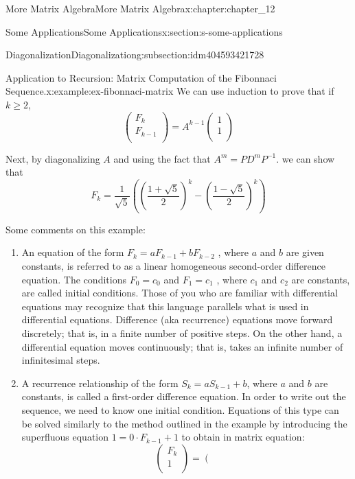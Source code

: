 \documentclass[twoside,10pt,]{book}
\numberwithin{equation}{section}
\begin{document}
\begin{chapterptx}{More Matrix Algebra}{}{More Matrix Algebra}{}{}{x:chapter:chapter_12}
\begin{sectionptx}{Some Applications}{}{Some Applications}{}{}{x:section:s-some-applications}
\begin{subsectionptx}{Diagonalization}{}{Diagonalization}{}{}{g:subsection:idm404593421728}
\begin{example}{Application to Recursion: Matrix Computation of the Fibonnaci Sequence.}{x:example:ex-fibonnaci-matrix}
We can use induction to prove that if \(k\geq 2\),%
\begin{equation*}
\left(
\begin{array}{c}
F_k \\
F_{k-1} \\
\end{array}
\right)=A^{k-1} \left(
\begin{array}{c}
1 \\
1 \\
\end{array}
\right)
\end{equation*}
%
\par
Next, by diagonalizing \(A\) and using the fact that \(A^{m }= P D^m P^{-1}\). we can show that%
\begin{equation*}
F_k= \frac{1}{\sqrt{5}}\left( \left(\frac{1+\sqrt{5}}{2}\right)^k- \left(\frac{1-\sqrt{5}}{2}\right)^k\right)
\end{equation*}
%
\par
Some comments on this example:%
\begin{enumerate}[label=(\arabic*)]
\item{}An equation of the form \(F_k = a F_{k-1} + b F_{k-2}\) , where \(a\) and \(b\) are given constants, is  referred to as a linear homogeneous second-order difference equation. The conditions \(F_0=c_0\) and \(F_1= c_1\) , where \(c_1\) and \(c_2\) are constants, are called initial conditions. Those of you who are familiar with differential equations may recognize that this language parallels what is used in differential equations. Difference (aka recurrence) equations move forward discretely; that is, in a finite number of positive steps.  On the other hand,  a differential equation moves continuously; that is, takes an infinite number of infinitesimal steps.%
\item{}A recurrence relationship of the form \(S_k = a S_{k-1} + b\), where \(a\) and \(b\) are constants, is called a first-order difference equation. In order to write out the sequence, we need to know one initial condition.  Equations of this type can be solved similarly to the method outlined in the example by introducing the superfluous equation \(1 =0\cdot F_{k-1}+1\) to obtain in matrix equation:%
\begin{equation*}
\left(
\begin{array}{c}
F_k \\
1 \\
\end{array}
\right)=\left(
\begin{array}{cc}

\end{array}
\end{equation*}
\end{enumerate}
\end{example}
\end{subsectionptx}
\end{sectionptx}
\end{chapterptx}
\end{document}
